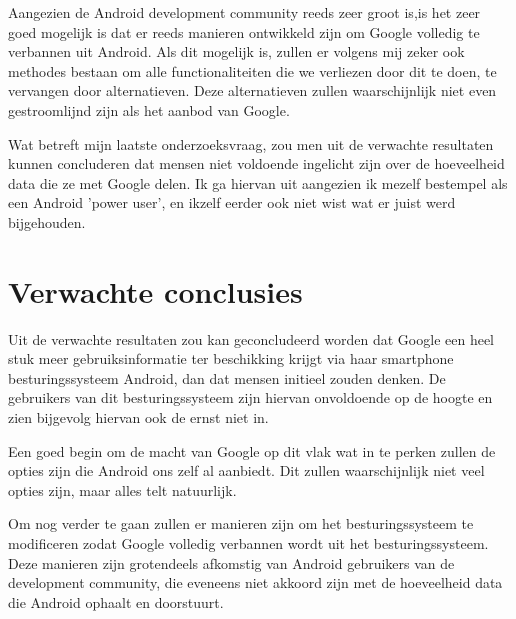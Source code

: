 \vspace{3mm}

\noindent Aangezien de Android development community reeds zeer groot is,is het zeer goed mogelijk is dat er reeds manieren ontwikkeld zijn om Google volledig te verbannen uit Android. Als dit mogelijk is, zullen er volgens mij zeker ook methodes bestaan om alle functionaliteiten die we verliezen door dit te doen, te vervangen door alternatieven. Deze alternatieven zullen waarschijnlijk niet even gestroomlijnd zijn als het aanbod van Google. 

\vspace{3mm}

\noindent Wat betreft mijn laatste onderzoeksvraag, zou men uit de verwachte resultaten kunnen concluderen dat mensen niet voldoende ingelicht zijn over de hoeveelheid data die ze met Google delen. Ik ga hiervan uit aangezien ik mezelf bestempel als een Android 'power user', en ikzelf eerder ook niet wist wat er juist werd bijgehouden.


\section{Verwachte conclusies}
\label{sec:verwachte_conclusies}


Uit de verwachte resultaten zou kan geconcludeerd worden dat Google een heel stuk meer gebruiksinformatie ter beschikking krijgt via haar smartphone besturingssysteem Android, dan dat mensen initieel zouden denken. De gebruikers van dit besturingssysteem zijn hiervan onvoldoende op de hoogte en zien bijgevolg hiervan ook de ernst niet in.

\vspace{3mm}

\noindent Een goed begin om de macht van Google op dit vlak wat in te perken zullen de opties zijn die Android ons zelf al aanbiedt. Dit zullen waarschijnlijk niet veel opties zijn, maar alles telt natuurlijk. 

\vspace{3mm}

\noindent Om nog verder te gaan zullen er manieren zijn om het besturingssysteem te modificeren zodat Google volledig verbannen wordt uit het besturingssysteem. Deze manieren zijn grotendeels afkomstig van Android gebruikers van de development community, die eveneens niet akkoord zijn met de hoeveelheid data die Android ophaalt en doorstuurt.


